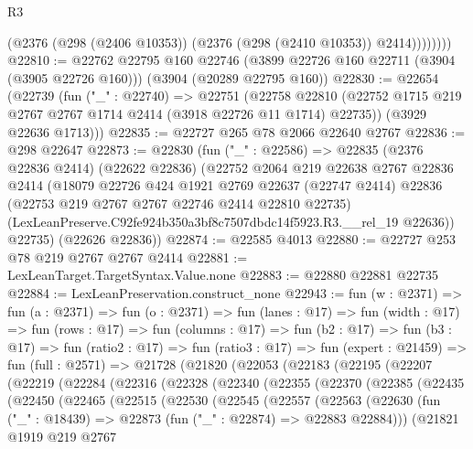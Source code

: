 \begin{lexlean}{R3}
\begin{coremodule}
                (@2376 (@298 (@2406 @10353)) (@2376 (@298 (@2410 @10353)) @2414))))))))
@22810 := @22762
    @22795
    @160
    @22746
    (@3899 @22726 @160 @22711 (@3904 (@3905 @22726 @160)))
    (@3904 (@20289 @22795 @160))
@22830 := @22654
    (@22739
      (fun ("_" : @22740) =>
      @22751
        (@22758 @22810 (@22752 @1715 @219 @2767 @2767 @1714 @2414 (@3918 @22726 @11 @1714) @22735))
        (@3929 @22636 @1713)))
@22835 := @22727 @265 @78 @2066 @22640 @2767
@22836 := @298 @22647
@22873 := @22830
    (fun ("_" : @22586) =>
    @22835
      (@2376 @22836 @2414)
      (@22622 @22836)
      (@22752
        @2064
        @219
        @22638
        @2767
        @22836
        @2414
        (@18079
          @22726
          @424
          @1921
          @2769
          @22637
          (@22747 @2414)
          @22836
          (@22753 @219 @2767 @2767 @22746 @2414 @22810 @22735)
          (LexLeanPreserve.C92fe924b350a3bf8c7507dbdc14f5923.R3.__rel_19 @22636))
        @22735)
      (@22626 @22836))
@22874 := @22585 @4013
@22880 := @22727 @253 @78 @219 @2767 @2767 @2414
@22881 := LexLeanTarget.TargetSyntax.Value.none
@22883 := @22880 @22881 @22735
@22884 := LexLeanPreservation.construct_none
@22943 := fun (w : @2371) =>
  fun (a : @2371) =>
  fun (o : @2371) =>
  fun (lanes : @17) =>
  fun (width : @17) =>
  fun (rows : @17) =>
  fun (columns : @17) =>
  fun (b2 : @17) =>
  fun (b3 : @17) =>
  fun (ratio2 : @17) =>
  fun (ratio3 : @17) =>
  fun (expert : @21459) =>
  fun (full : @2571) =>
  @21728
    (@21820
      (@22053
        (@22183
          (@22195
            (@22207
              (@22219
                (@22284
                  (@22316
                    (@22328
                      (@22340
                        (@22355
                          (@22370
                            (@22385
                              (@22435
                                (@22450
                                  (@22465
                                    (@22515
                                      (@22530
                                        (@22545
                                          (@22557
                                            (@22563
                                              (@22630
                                                (fun ("_" : @18439) =>
                                                @22873 (fun ("_" : @22874) => @22883 @22884)))
                                              (@21821
                                                @1919
                                                @219
                                                @2767

\end{coremodule}
\end{lexlean}
